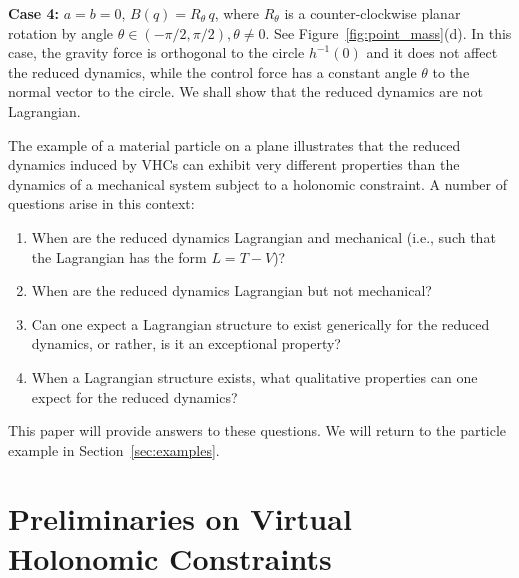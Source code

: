 {\bf Case 4:} $a=b=0$, $B(q) = R_\theta\, q$, where $R_\theta$
is a counter-clockwise planar rotation by angle $\theta \in
(-\pi/2,\pi/2), \theta \neq 0$.  See
Figure~\ref{fig:point_mass}(d). In this case, the gravity force is
orthogonal to the circle $h^{-1}(0)$ and it does not affect the
reduced dynamics, while the control force has a constant angle
$\theta$ to the normal vector to the circle.  We shall show that the
reduced dynamics are not Lagrangian.

The example of a material particle on a plane illustrates that the
reduced dynamics induced by VHCs can exhibit very different properties
than the dynamics of a mechanical system subject to a holonomic
constraint.  A number of questions arise in this context:
\begin{enumerate}[Q1]
	\item When are the reduced dynamics Lagrangian and mechanical (i.e.,
	such that the Lagrangian has the form $L=T-V$)?
	
	\item When are the reduced dynamics Lagrangian but not mechanical?
	
	\item Can one expect a Lagrangian structure to exist generically for
	the reduced dynamics, or rather, is it an exceptional property?
	
	\item When a Lagrangian structure exists, what qualitative properties
	can one expect for the reduced dynamics?
\end{enumerate}

This paper will provide answers to these questions. We will return
to the particle example in Section~\ref{sec:examples}.

\section{Preliminaries on Virtual Holonomic Constraints}
\label{sec:Prelim}

